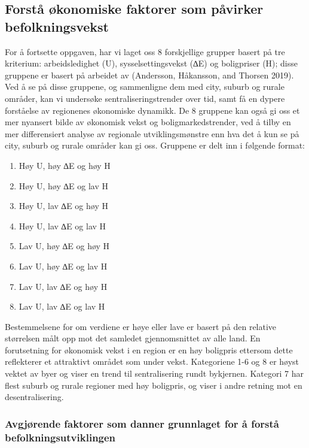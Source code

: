 \documentclass[
  letterpaper,
  DIV=11,
  numbers=noendperiod]{scrartcl}
\providecommand{\tightlist}{%
  \setlength{\itemsep}{0pt}\setlength{\parskip}{0pt}}\usepackage{longtable,booktabs,array}
\begin{document}
\hypertarget{forstuxe5-uxf8konomiske-faktorer-som-puxe5virker-befolkningsvekst}{%
\subsection{\texorpdfstring{\textbf{Forstå økonomiske faktorer som
påvirker
befolkningsvekst}}{Forstå økonomiske faktorer som påvirker befolkningsvekst}}\label{forstuxe5-uxf8konomiske-faktorer-som-puxe5virker-befolkningsvekst}}

For å fortsette oppgaven, har vi laget oss 8 forskjellige grupper basert
på tre kriterium: arbeidsledighet (U), sysselsettingsvekst (∆E) og
boligpriser (H); disse gruppene er basert på arbeidet av (Andersson,
Håkansson, and Thorsen 2019). Ved å se på disse gruppene, og sammenligne
dem med city, suburb og rurale områder, kan vi undersøke
sentraliseringstrender over tid, samt få en dypere forståelse av
regionenes økonomiske dynamikk. De 8 gruppene kan også gi oss et mer
nyansert bilde av økonomisk vekst og boligmarkedstrender, ved å tilby en
mer differensiert analyse av regionale utviklingsmønstre enn hva det å
kun se på city, suburb og rurale områder kan gi oss. Gruppene er delt
inn i følgende format:

\begin{enumerate}
\def\labelenumi{\arabic{enumi}.}
\tightlist
\item
  Høy U, høy ∆E og høy H
\item
  Høy U, høy ∆E og lav H
\item
  Høy U, lav ∆E og høy H
\item
  Høy U, lav ∆E og lav H
\item
  Lav U, høy ∆E og høy H
\item
  Lav U, høy ∆E og lav H
\item
  Lav U, lav ∆E og høy H
\item
  Lav U, lav ∆E og lav H
\end{enumerate}

Bestemmelsene for om verdiene er høye eller lave er basert på den
relative størrelsen målt opp mot det samledet gjennomsnittet av alle
land. En forutsetning for økonomisk vekst i en region er en høy
boligpris ettersom dette reflekterer et attraktivt området som under
vekst. Kategoriene 1-6 og 8 er høyst vektet av byer og viser en trend
til sentralisering rundt bykjernen. Kategori 7 har flest suburb og
rurale regioner med høy boligpris, og viser i andre retning mot en
desentralisering.

\hypertarget{avgjuxf8rende-faktorer-som-danner-grunnlaget-for-uxe5-forstuxe5-befolkningsutviklingen}{%
\subsubsection{Avgjørende faktorer som danner grunnlaget for å forstå
befolkningsutviklingen}\label{avgjuxf8rende-faktorer-som-danner-grunnlaget-for-uxe5-forstuxe5-befolkningsutviklingen}}
\end{document}
